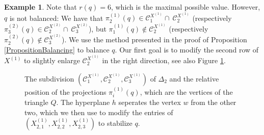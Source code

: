 \documentclass[11pt]{amsart}
\theoremstyle{definition}
\newtheorem{example}[theorem]{Example}
\numberwithin{subcase}{case}
\begin{document}
\begin{example}
Note that $r(q)=6$, which is the maximal possible value. However, $q$
is not balanced: We have that $\pi^{(1)}_2(q) \in
\mathcal{C}^{X^{(1)}}_1 \cap \ \mathcal{C}^{X^{(1)}}_2$ (respectively
$\pi^{(2)}_3(q) \in \mathcal{C}^{X^{(2)}}_2 \cap \
\mathcal{C}^{X^{(2)}}_3$), but $\pi^{(1)}_1(q) \not\in
\mathcal{C}^{X^{(1)}}_2$ (respectively $\pi^{(2)}_2(q) \not\in
\mathcal{C}^{X^{(2)}}_3$). We use the method presented in the proof of Proposition
\ref{PropositionBalancing} to balance $q$.  Our first goal is to modify the second row of $X^{(1)}$ to slightly enlarge $\mathcal{C}^{X^{(1)}}_2$ in the right direction, see also Figure \ref{FigBalancing}.
\begin{figure}[ht]
\centering
{}
\caption{The subdivision $(\mathcal{C}^{X^{(1)}}_1,\mathcal{C}^{X^{(1)}}_2,\mathcal{C}^{X^{(1)}}_3)$ of $\Delta_2$ and the relative position of the projections $\pi^{(1)}_i(q)$, which are the vertices of the triangle $Q$. The hyperplane $h$ seperates the vertex $w$ from the other two, which we then use to modify the entries of $(X^{(1)}_{2,1},X^{(1)}_{2,2},X^{(1)}_{2,3} )$ to stabilize $q$.}
\label{FigBalancing}
\end{figure}


\end{example}
\end{document}
